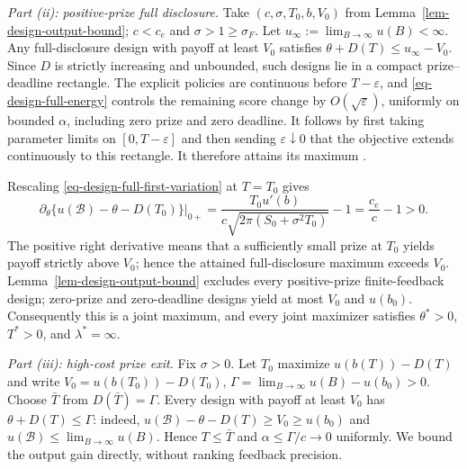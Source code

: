 \documentclass[mnsc]{informs3}
\begin{document}
\begin{APPENDICES}
{{
\emph{Part (ii): positive-prize full disclosure.}
Take $(c,\sigma,T_0,b,V_0)$ from Lemma~\ref{lem-design-output-bound};
$c<c_e$ and $\sigma>1\geq\sigma_F$.
Let $u_\infty:=\lim_{B\to\infty}u(B)<\infty$. Any full-disclosure
design with payoff at least $V_0$ satisfies
$\theta+D(T)\leq u_\infty-V_0$. Since $D$ is strictly increasing and
unbounded, such designs lie in a compact prize--deadline rectangle.
The explicit policies are continuous before $T-\varepsilon$, and
\eqref{eq-design-full-energy} controls the remaining score change by $O(\sqrt\varepsilon)$,
uniformly on bounded $\alpha$, including zero prize and zero deadline.
It follows by first taking parameter limits on $[0,T-\varepsilon]$ and
then sending $\varepsilon\downarrow0$ that the objective extends
continuously to this rectangle. It therefore attains its maximum
\citep[][Chapter~6]{Berge1963}.

Rescaling \eqref{eq-design-full-first-variation} at $T=T_0$ gives
\begin{equation}\label{eq-design-full-entry-variation}
\left.\partial_\theta\{u(\mathcal B)-\theta-D(T_0)\}\right|_{0+}
=\frac{T_0u'(b)}{c\sqrt{2\pi(S_0+\sigma^2T_0)}}-1
=\frac{c_e}{c}-1>0.
\end{equation}
The positive right derivative means that a sufficiently small prize at
$T_0$ yields payoff strictly above $V_0$; hence the attained
full-disclosure maximum exceeds $V_0$.
Lemma~\ref{lem-design-output-bound} excludes every positive-prize
finite-feedback design; zero-prize and zero-deadline designs yield
at most $V_0$ and $u(b_0)$.
Consequently this is a joint maximum, and every joint maximizer satisfies
$\theta^*>0$, $T^*>0$, and $\lambda^*=\infty$.
}

\emph{Part (iii): high-cost prize exit.}
Fix $\sigma>0$. Let $T_0$ maximize $u(b(T))-D(T)$ and write
$V_0=u(b(T_0))-D(T_0)$,
$\Gamma=\lim_{B\to\infty}u(B)-u(b_0)>0$.
Choose $\bar T$ from $D(\bar T)=\Gamma$.
Every design with payoff at least $V_0$ has
$\theta+D(T)\le\Gamma$: indeed,
$u(\mathcal B)-\theta-D(T)\geq V_0\geq u(b_0)$ and
$u(\mathcal B)\leq\lim_{B\to\infty}u(B)$. Hence $T\le\bar T$ and
$\alpha\le\Gamma/c\to0$ uniformly. We bound the output gain directly,
without ranking feedback precision.

}
\end{APPENDICES}
\end{document}
